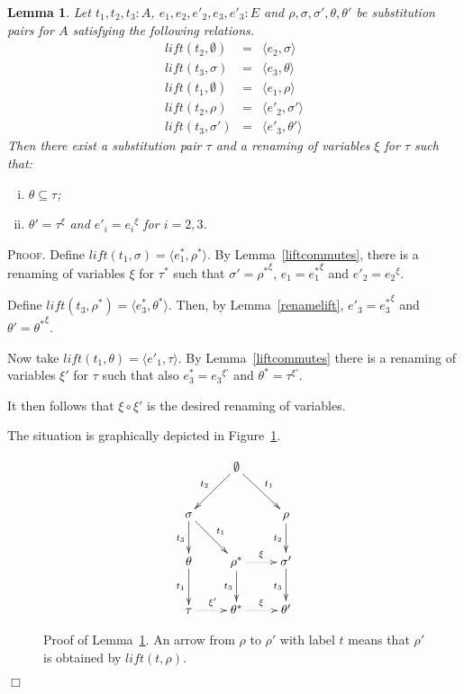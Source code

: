 \documentclass{article}
\newtheorem{lemma}[definition]{Lemma}
\newenvironment{proof}{\smallskip\textsc{Proof.}}{\hspace*{\fill}$\Box$}
\newcommand{\lift}{\ensuremath{\mathit{lift}}}
\newcommand{\renamevar}[2]{\ensuremath{{#1}^{#2}}}
\newcommand{\isrenamevar}[3]{\ensuremath{{#1}=\renamevar{#2}{#3}}}
\begin{document}
\begin{lemma}\label{liftaddpred}
Let $t_1,t_2,t_3:A$, $e_1,e_2,e'_2,e_3,e'_3:E$ and
$\rho,\sigma,\sigma',\theta,\theta'$ be substitution pairs for $A$
satisfying the following relations.
\begin{eqnarray*}
\lift(t_2,\emptyset) & = & \langle e_2,\sigma\rangle\\
\lift(t_3,\sigma) & = & \langle e_3,\theta\rangle\\
\lift(t_1,\emptyset) & = & \langle e_1,\rho\rangle\\
\lift(t_2,\rho) & = & \langle e'_2,\sigma'\rangle\\
\lift(t_3,\sigma') & = & \langle e'_3,\theta'\rangle
\end{eqnarray*}
Then there exist a substitution pair $\tau$ and a renaming of variables
$\xi$ for $\tau$ such that:
\begin{enumerate}[(i)]
\item $\theta\subseteq\tau$;
\item {\isrenamevar{\theta'}\tau\xi} and {\isrenamevar{e'_i}{e_i}\xi} for $i=2,3$.
\end{enumerate}
\end{lemma}
\begin{proof}
Define $\lift(t_1,\sigma)=\langle e^\ast_1,\rho^\ast\rangle$.
By Lemma~\ref{liftcommutes}, there is a renaming of variables $\xi$ for
$\tau^\ast$ such that {\isrenamevar{\sigma'}{\rho^\ast}\xi},
{\isrenamevar{e_1}{e^\ast_1}\xi} and {\isrenamevar{e'_2}{e_2}\xi}.

Define $\lift(t_3,\rho^\ast)=\langle e^\ast_3,\theta^\ast\rangle$.
Then, by Lemma~\ref{renamelift}, {\isrenamevar{e'_3}{e^\ast_3}\xi}
and {\isrenamevar{\theta'}{\theta^\ast}\xi}.

Now take $\lift(t_1,\theta)=\langle e'_1,\tau\rangle$.
By Lemma~\ref{liftcommutes} there is a renaming of variables $\xi'$ for
$\tau$ such that also ${\isrenamevar{e^\ast_3}{e_3}{\xi'}}$ and
{\isrenamevar{\theta^\ast}\tau{\xi'}}.

It then follows that $\xi\circ\xi'$ is the desired renaming of variables.

The situation is graphically depicted in Figure~\ref{fig:liftaddpred}.
\begin{figure}[htb]
\[\xymatrix{
 & \emptyset \ar[dl]_{t_2} \ar[dr]^{t_1} \\
 \sigma \ar[d]_{t_3} \ar[dr]^{t_1} & & \rho \ar[d]_{t_2} \\
 \theta \ar[d]_{t_1} & \rho^\ast \ar@{.>}[r]^{\xi} \ar[d]_{t_3}
 & \sigma' \ar[d]_{t_3} \\
 \tau \ar@{.>}[r]^{\xi'} & \theta^\ast \ar@{.>}[r]^{\xi} & \theta'
}\]
\caption{Proof of Lemma~\ref{liftaddpred}.  An arrow from $\rho$ to
$\rho'$ with label $t$ means that $\rho'$ is obtained by $\lift(t,\rho)$.}
\label{fig:liftaddpred}
\end{figure}
\end{proof}
\end{document}
